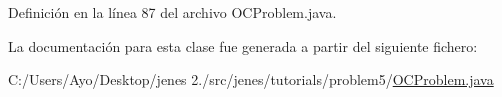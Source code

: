 Definición en la línea 87 del archivo O\-C\-Problem.\-java.



La documentación para esta clase fue generada a partir del siguiente fichero\-:\begin{DoxyCompactItemize}
\item 
C\-:/\-Users/\-Ayo/\-Desktop/jenes 2./src/jenes/tutorials/problem5/\hyperlink{problem5_2_o_c_problem_8java}{O\-C\-Problem.\-java}\end{DoxyCompactItemize}
